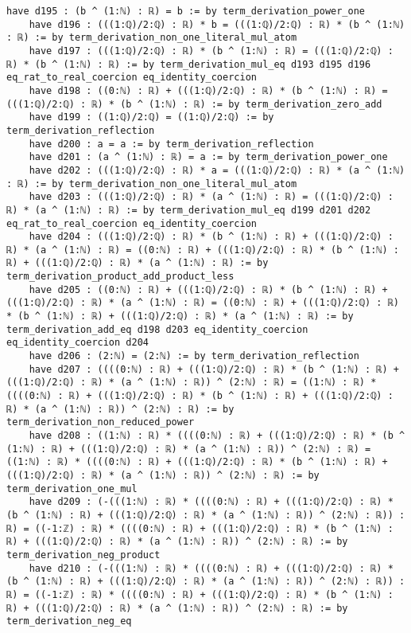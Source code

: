 \documentclass{article}
\begin{document}
\begin{tcolorbox}[colback=white!10, width=\linewidth]
\begin{lstlisting}[language=Lean4]
    have d195 : (b ^ (1:ℕ) : ℝ) = b := by term_derivation_power_one
    have d196 : (((1:ℚ)/2:ℚ) : ℝ) * b = (((1:ℚ)/2:ℚ) : ℝ) * (b ^ (1:ℕ) : ℝ) := by term_derivation_non_one_literal_mul_atom
    have d197 : (((1:ℚ)/2:ℚ) : ℝ) * (b ^ (1:ℕ) : ℝ) = (((1:ℚ)/2:ℚ) : ℝ) * (b ^ (1:ℕ) : ℝ) := by term_derivation_mul_eq d193 d195 d196 eq_rat_to_real_coercion eq_identity_coercion
    have d198 : ((0:ℕ) : ℝ) + (((1:ℚ)/2:ℚ) : ℝ) * (b ^ (1:ℕ) : ℝ) = (((1:ℚ)/2:ℚ) : ℝ) * (b ^ (1:ℕ) : ℝ) := by term_derivation_zero_add
    have d199 : ((1:ℚ)/2:ℚ) = ((1:ℚ)/2:ℚ) := by term_derivation_reflection
    have d200 : a = a := by term_derivation_reflection
    have d201 : (a ^ (1:ℕ) : ℝ) = a := by term_derivation_power_one
    have d202 : (((1:ℚ)/2:ℚ) : ℝ) * a = (((1:ℚ)/2:ℚ) : ℝ) * (a ^ (1:ℕ) : ℝ) := by term_derivation_non_one_literal_mul_atom
    have d203 : (((1:ℚ)/2:ℚ) : ℝ) * (a ^ (1:ℕ) : ℝ) = (((1:ℚ)/2:ℚ) : ℝ) * (a ^ (1:ℕ) : ℝ) := by term_derivation_mul_eq d199 d201 d202 eq_rat_to_real_coercion eq_identity_coercion
    have d204 : (((1:ℚ)/2:ℚ) : ℝ) * (b ^ (1:ℕ) : ℝ) + (((1:ℚ)/2:ℚ) : ℝ) * (a ^ (1:ℕ) : ℝ) = ((0:ℕ) : ℝ) + (((1:ℚ)/2:ℚ) : ℝ) * (b ^ (1:ℕ) : ℝ) + (((1:ℚ)/2:ℚ) : ℝ) * (a ^ (1:ℕ) : ℝ) := by term_derivation_product_add_product_less
    have d205 : ((0:ℕ) : ℝ) + (((1:ℚ)/2:ℚ) : ℝ) * (b ^ (1:ℕ) : ℝ) + (((1:ℚ)/2:ℚ) : ℝ) * (a ^ (1:ℕ) : ℝ) = ((0:ℕ) : ℝ) + (((1:ℚ)/2:ℚ) : ℝ) * (b ^ (1:ℕ) : ℝ) + (((1:ℚ)/2:ℚ) : ℝ) * (a ^ (1:ℕ) : ℝ) := by term_derivation_add_eq d198 d203 eq_identity_coercion eq_identity_coercion d204
    have d206 : (2:ℕ) = (2:ℕ) := by term_derivation_reflection
    have d207 : ((((0:ℕ) : ℝ) + (((1:ℚ)/2:ℚ) : ℝ) * (b ^ (1:ℕ) : ℝ) + (((1:ℚ)/2:ℚ) : ℝ) * (a ^ (1:ℕ) : ℝ)) ^ (2:ℕ) : ℝ) = ((1:ℕ) : ℝ) * ((((0:ℕ) : ℝ) + (((1:ℚ)/2:ℚ) : ℝ) * (b ^ (1:ℕ) : ℝ) + (((1:ℚ)/2:ℚ) : ℝ) * (a ^ (1:ℕ) : ℝ)) ^ (2:ℕ) : ℝ) := by term_derivation_non_reduced_power
    have d208 : ((1:ℕ) : ℝ) * ((((0:ℕ) : ℝ) + (((1:ℚ)/2:ℚ) : ℝ) * (b ^ (1:ℕ) : ℝ) + (((1:ℚ)/2:ℚ) : ℝ) * (a ^ (1:ℕ) : ℝ)) ^ (2:ℕ) : ℝ) = ((1:ℕ) : ℝ) * ((((0:ℕ) : ℝ) + (((1:ℚ)/2:ℚ) : ℝ) * (b ^ (1:ℕ) : ℝ) + (((1:ℚ)/2:ℚ) : ℝ) * (a ^ (1:ℕ) : ℝ)) ^ (2:ℕ) : ℝ) := by term_derivation_one_mul
    have d209 : (-(((1:ℕ) : ℝ) * ((((0:ℕ) : ℝ) + (((1:ℚ)/2:ℚ) : ℝ) * (b ^ (1:ℕ) : ℝ) + (((1:ℚ)/2:ℚ) : ℝ) * (a ^ (1:ℕ) : ℝ)) ^ (2:ℕ) : ℝ)) : ℝ) = ((-1:ℤ) : ℝ) * ((((0:ℕ) : ℝ) + (((1:ℚ)/2:ℚ) : ℝ) * (b ^ (1:ℕ) : ℝ) + (((1:ℚ)/2:ℚ) : ℝ) * (a ^ (1:ℕ) : ℝ)) ^ (2:ℕ) : ℝ) := by term_derivation_neg_product
    have d210 : (-(((1:ℕ) : ℝ) * ((((0:ℕ) : ℝ) + (((1:ℚ)/2:ℚ) : ℝ) * (b ^ (1:ℕ) : ℝ) + (((1:ℚ)/2:ℚ) : ℝ) * (a ^ (1:ℕ) : ℝ)) ^ (2:ℕ) : ℝ)) : ℝ) = ((-1:ℤ) : ℝ) * ((((0:ℕ) : ℝ) + (((1:ℚ)/2:ℚ) : ℝ) * (b ^ (1:ℕ) : ℝ) + (((1:ℚ)/2:ℚ) : ℝ) * (a ^ (1:ℕ) : ℝ)) ^ (2:ℕ) : ℝ) := by term_derivation_neg_eq

\end{lstlisting}
\end{tcolorbox}
\end{document}
